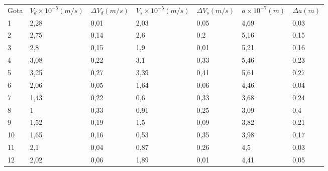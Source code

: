 \begin{table}[ht!]
\centering

\begin{tabular}{l|ll|ll|ll|}
\rowcolor[HTML]{C0C0C0} 
Gota & $V_d \times 10^{-5}(m/s)$ & $\Delta V_d (m/s)$ & $V_s \times 10^{-5}(m/s)$ & $\Delta V_s (m/s)$ & $a \times 10^{-7}(m)$ & $\Delta a(m)$ \\
1    & 2,28                      & 0,01               & 2,03                      & 0,05               & 4,69                  & 0,03          \\
\rowcolor[HTML]{C0C0C0} 
2    & 2,75                      & 0,14               & 2,6                       & 0,2                & 5,16                  & 0,15          \\
3    & 2,8                       & 0,15               & 1,9                       & 0,01               & 5,21                  & 0,16          \\
\rowcolor[HTML]{C0C0C0} 
4    & 3,08                      & 0,22               & 3,1                       & 0,33               & 5,46                  & 0,23          \\
5    & 3,25                      & 0,27               & 3,39                      & 0,41               & 5,61                  & 0,27          \\
\rowcolor[HTML]{C0C0C0} 
6    & 2,06                      & 0,05               & 1,64                      & 0,06               & 4,46                  & 0,04          \\
7    & 1,43                      & 0,22               & 0,6                       & 0,33               & 3,68                  & 0,24          \\
\rowcolor[HTML]{C0C0C0} 
8    & 1                         & 0,33               & 0,91                      & 0,25               & 3,09                  & 0,4           \\
9    & 1,52                      & 0,19               & 1,5                       & 0,09               & 3,82                  & 0,21          \\
\rowcolor[HTML]{C0C0C0} 
10   & 1,65                      & 0,16               & 0,53                      & 0,35               & 3,98                  & 0,17          \\
11   & 2,1                       & 0,04               & 0,87                      & 0,26               & 4,5                   & 0,03          \\
\rowcolor[HTML]{C0C0C0} 
12   & 2,02                      & 0,06               & 1,89                      & 0,01               & 4,41                  & 0,05          \\

\end{tabular}
\end{table}

